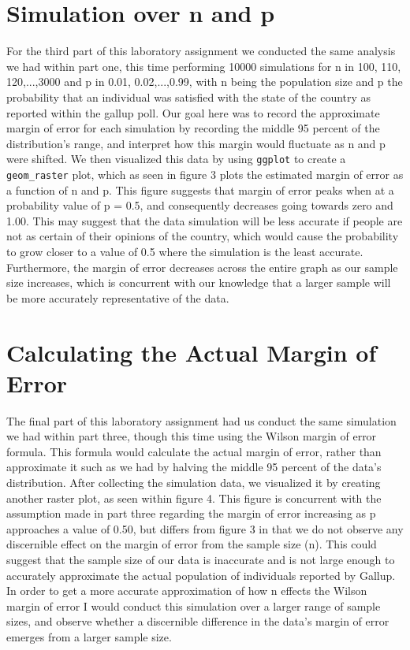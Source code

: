 \documentclass{article}\usepackage[]{graphicx}\usepackage[]{xcolor}
\begin{document}
\begin{multicols}{2}
\section{Simulation over n and p}
For the third part of this laboratory assignment we conducted the same analysis we had within part one, this time performing 10000 simulations for n in {100, 110, 120,...,3000} and p in {0.01, 0.02,...,0.99}, with n being the population size and p the probability that an individual was satisfied with the state of the country as reported within the gallup poll. Our goal here was to record the approximate margin of error for each simulation by recording the middle 95 percent of the distribution's range, and interpret how this margin would fluctuate as n and p were shifted. We then visualized this data by using \texttt{ggplot} to create a \texttt{geom_raster} plot, which as seen in figure 3 plots the estimated margin of error as a function of n and p. This figure suggests that margin of error peaks when at a probability value  of p = 0.5, and consequently decreases going towards zero and 1.00. This may suggest that the data simulation will be less accurate if people are not as certain of their opinions of the country, which would cause the probability to grow closer to a value of 0.5 where the simulation is the least accurate. Furthermore, the margin of error decreases across the entire graph as our sample size increases, which is concurrent with our knowledge that a larger sample will be more accurately representative of the data.



\section{Calculating the Actual Margin of Error}
 The final part of this laboratory assignment had us conduct the same simulation we had within part three, though this time using the Wilson margin of error formula. This formula would calculate the actual margin of error, rather than approximate it such as we had by halving the middle 95 percent of the data's distribution. After collecting the simulation data, we visualized it by creating another raster plot, as seen within figure 4. This figure is concurrent with the assumption made in part three regarding the margin of error increasing as p approaches a value of 0.50, but differs from figure 3 in that we do not observe any discernible effect on the margin of error from the sample size (n). This could suggest that the sample size of our data is inaccurate and is not large enough to accurately approximate the actual population of individuals reported by Gallup. In order to get a more accurate approximation of how n effects the Wilson margin of error I would conduct this simulation over a larger range of sample sizes, and observe whether a discernible difference in  the data's margin of error emerges from a larger sample size.




\end{multicols}
\end{document}
